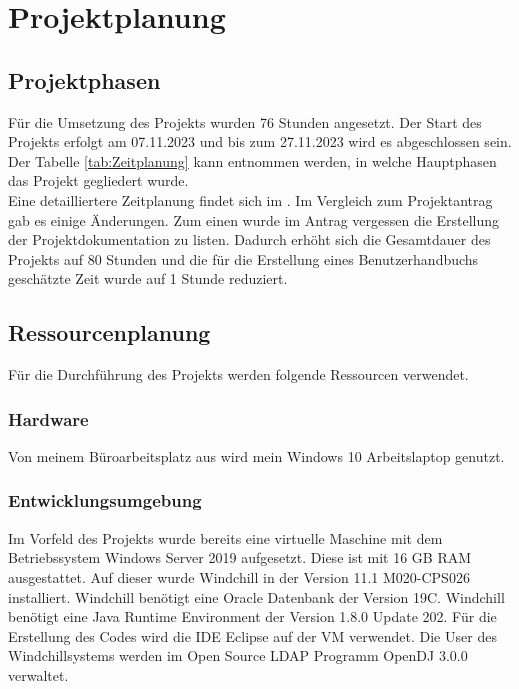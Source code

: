 \section{Projektplanung} 
\label{sec:Projektplanung}


\subsection{Projektphasen}
\label{sec:Projektphasen}

Für die Umsetzung des Projekts wurden 76 Stunden angesetzt.
Der Start des Projekts erfolgt am 07.11.2023 und bis zum 27.11.2023 wird es abgeschlossen sein.
Der Tabelle \ref{tab:Zeitplanung} kann entnommen werden, in welche Hauptphasen das Projekt gegliedert wurde.
\\
Eine detailliertere Zeitplanung findet sich im .
Im Vergleich zum Projektantrag gab es einige Änderungen.
Zum einen wurde im Antrag vergessen die Erstellung der Projektdokumentation zu listen.
Dadurch erhöht sich die Gesamtdauer des Projekts auf 80 Stunden und die für die Erstellung eines Benutzerhandbuchs geschätzte Zeit wurde auf 1 Stunde reduziert.


\subsection{Ressourcenplanung}
\label{sec:Ressourcenplanung}

Für die Durchführung des Projekts werden folgende Ressourcen verwendet.

\subsubsection{Hardware}
Von meinem Büroarbeitsplatz aus wird mein Windows 10 Arbeitslaptop genutzt.

\subsubsection{Entwicklungsumgebung}
Im Vorfeld des Projekts wurde bereits eine virtuelle Maschine mit dem Betriebssystem Windows Server 2019 aufgesetzt.
Diese ist mit 16 GB RAM ausgestattet.
Auf dieser wurde Windchill in der Version 11.1 M020-CPS026 installiert.
Windchill benötigt eine Oracle Datenbank der Version 19C.
Windchill benötigt eine Java Runtime Environment der Version 1.8.0 Update 202.
Für die Erstellung des Codes wird die IDE Eclipse auf der \acs{VM} verwendet.
Die User des Windchillsystems werden im Open Source LDAP Programm OpenDJ 3.0.0 verwaltet.

